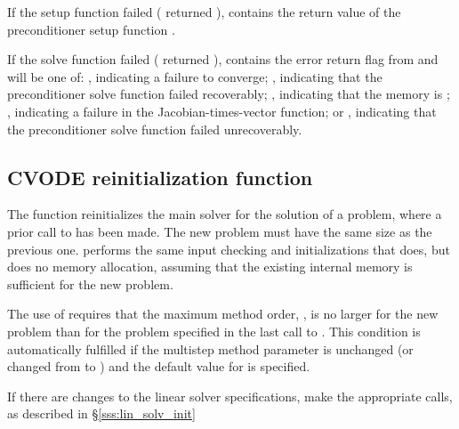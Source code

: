 {
  If the {\cvsptfqmr} setup function failed ( returned
  ),  contains the return value of the
  preconditioner setup function .

  If the {\cvsptfqmr} solve function failed ( returned
  ),  contains the error return flag from
   and will be one of:
 , indicating a failure to converge;
 , indicating that the preconditioner solve function
  failed recoverably;
  , indicating that the {\sptfqmr} memory is ;
  , indicating a failure in the Jacobian-times-vector
  function; or
  , indicating that the preconditioner solve
  function  failed unrecoverably.
}

\subsection{CVODE reinitialization function}\label{sss:cvreinit}

The function  reinitializes the main {\cvode} solver for
the solution of a problem, where a prior call to  has
been made. The new problem must have the same size as the previous one.
 performs the same input checking and initializations 
that  does, but does no memory allocation, assuming that the 
existing internal memory is sufficient for the new problem.             
                                                                 
The use of  requires that the maximum method order,    
, is no larger for the new problem than for the problem  
specified in the last call to .  This condition is  
automatically fulfilled if the multistep method parameter   
is unchanged (or changed from  to ) and the default    
value for  is specified.

If there are changes to the linear solver specifications, make the
appropriate  calls, as described in \S\ref{sss:lin_solv_init}

